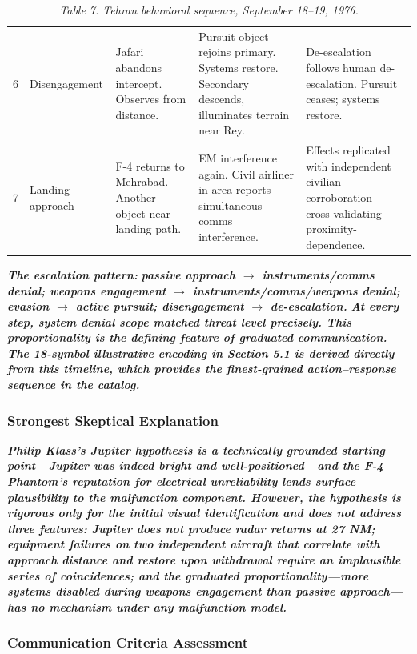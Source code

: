 \documentclass[11pt,letterpaper]{article}
\begin{document}
\begin{table}[H]
{\begin{tabularx}{\textwidth}{p{}p{}p{}p{}p{}}
6 & Disengagement & Jafari abandons intercept. Observes from distance. & Pursuit object rejoins primary. Systems restore. Secondary descends, illuminates terrain near Rey. & De-escalation follows human de-escalation. Pursuit ceases; systems restore. \\
7 & Landing approach & F-4 returns to Mehrabad. Another object near landing path. & EM interference again. Civil airliner in area reports simultaneous comms interference. & Effects replicated with independent civilian corroboration---cross-validating proximity-dependence. \\
\bottomrule
\end{tabularx}}
\caption*{\small\textit{Table 7. Tehran behavioral sequence, September 18--19, 1976.}}
\end{table}


\textbf{\textit{The escalation pattern: }}\textbf{\textit{passive approach $\rightarrow$ instruments/comms denial; weapons engagement $\rightarrow$ instruments/comms/weapons denial; evasion $\rightarrow$ active pursuit; disengagement $\rightarrow$ de-escalation.}}\textbf{\textit{ At every step, system denial scope matched threat level precisely. This proportionality is the defining feature of graduated communication. The 18-symbol illustrative encoding in Section 5.1 is derived directly from this timeline, which provides the finest-grained action--response sequence in the catalog.}}


\subsubsection{Strongest Skeptical Explanation}

\textbf{\textit{Philip Klass's Jupiter hypothesis is a technically grounded starting point---Jupiter was indeed bright and well-positioned---and the F-4 Phantom's reputation for electrical unreliability lends surface plausibility to the malfunction component. However, the hypothesis is rigorous only for the initial visual identification and does not address three features: Jupiter does not produce radar returns at 27 NM; equipment failures on two independent aircraft that correlate with approach distance and restore upon withdrawal require an implausible series of coincidences; and the graduated proportionality---more systems disabled during weapons engagement than passive approach---has no mechanism under any malfunction model.}}


\subsubsection{Communication Criteria Assessment}
\end{document}
